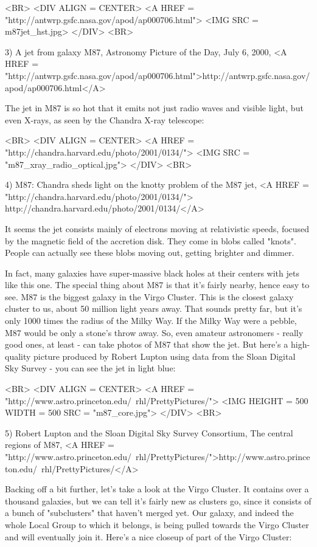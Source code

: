 <BR>
<DIV ALIGN = CENTER>
<A HREF = "http://antwrp.gsfc.nasa.gov/apod/ap000706.html">
<IMG SRC = m87jet_hst.jpg>
</DIV>
<BR>

3) A jet from galaxy M87, Astronomy Picture of the Day, July 6, 2000,
<A HREF = "http://antwrp.gsfc.nasa.gov/apod/ap000706.html">http://antwrp.gsfc.nasa.gov/apod/ap000706.html</A>

The jet in M87 is so hot that it emits not just radio waves and visible 
light, but even X-rays, as seen by the Chandra X-ray telescope:

<BR>
<DIV ALIGN = CENTER>
<A HREF = "http://chandra.harvard.edu/photo/2001/0134/">
<IMG SRC = "m87_xray_radio_optical.jpg">
</DIV>
<BR>

4) M87: Chandra sheds light on the knotty problem of the M87 jet,
<A HREF = "http://chandra.harvard.edu/photo/2001/0134/">
http://chandra.harvard.edu/photo/2001/0134/</A>

It seems the jet consists mainly of electrons moving at relativistic
speeds, focused by the magnetic field of the accretion disk.  They 
come in blobs called "knots".  People can actually see these blobs 
moving out, getting brighter and dimmer.

In fact, many galaxies have super-massive black holes at their centers
with jets like this one.  The special thing about M87 is that it's fairly 
nearby, hence easy to see.  M87 is the biggest galaxy in the Virgo Cluster. 
This is the closest galaxy cluster to us, about 50 million light years away.
That sounds pretty far, but it's only 1000 times the radius of the Milky
Way.  If the Milky Way were a pebble, M87 would be only a stone's throw
away.  So, even amateur astronomers - really good ones, at least - can take 
photos of M87 that show the jet.  But here's a high-quality picture produced
by Robert Lupton using data from the Sloan Digital Sky Survey - you can see 
the jet in light blue:

<BR>
<DIV ALIGN = CENTER>
<A HREF = "http://www.astro.princeton.edu/~rhl/PrettyPictures/">
<IMG HEIGHT = 500 WIDTH = 500 SRC = "m87_core.jpg">
</DIV>
<BR>

5) Robert Lupton and the Sloan Digital Sky Survey Consortium, The
central regions of M87, <A HREF =
"http://www.astro.princeton.edu/~rhl/PrettyPictures/">http://www.astro.princeton.edu/~rhl/PrettyPictures/</A>

Backing off a bit further, let's take a look at the Virgo Cluster.  It
contains over a thousand galaxies, but we can tell it's fairly new as
clusters go, since it consists of a bunch of "subclusters"
that haven't merged yet.  Our galaxy, and indeed the whole Local Group
to which it belongs, is being pulled towards the Virgo Cluster and
will eventually join it.  Here's a nice closeup of part of the Virgo
Cluster:

